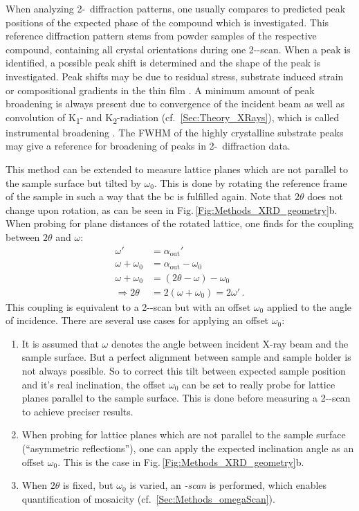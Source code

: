 When analyzing 2\texttheta-\textomega\ diffraction patterns, one usually compares to predicted peak positions of the expected phase of the compound which is investigated.
This reference diffraction pattern stems from powder samples of the respective compound, containing all crystal orientations during one 2\texttheta-\textomega-scan.
When a peak is identified, a possible peak shift is determined and the shape of the peak is investigated.
Peak shifts may be due to residual stress, substrate induced strain or compositional gradients in the thin film 
    \cite{harrington2021}.
A minimum amount of peak broadening is always present due to convergence of the incident beam as well as convolution of K\textalpha\textsubscript{1}- and K\textalpha\textsubscript{2}-radiation (cf.~\ref{Sec:Theory_XRays}), which is called instrumental broadening
    \cite{harrington2021}.
The \gls{FWHM} of the highly crystalline substrate peaks may give a reference for broadening of peaks in 2\texttheta-\textomega\ diffraction data.  

This method can be extended to measure lattice planes which are not parallel to the sample surface but tilted by $\omega_0$.
This is done by rotating the reference frame of the sample in such a way that the \gls{bc} is fulfilled again.
Note that $2\theta$ does not change upon rotation, as can be seen in Fig.\,\ref{Fig:Methods_XRD_geometry}b.
When probing for plane distances of the rotated lattice, one finds for the coupling between $2\theta$ and $\omega$:
\begin{align*}
    \omega'&=\alpha_\mathrm{out}'\\
    \omega+\omega_0&=\alpha_\mathrm{out}-\omega_0\\
    \omega+\omega_0&=(2\theta-\omega)-\omega_0\\
    \Rightarrow 2\theta&=2(\omega+\omega_0)=2\omega'\,.
\end{align*}
This coupling is equivalent to a 2\texttheta-\textomega-scan but with an offset $\omega_0$ applied to the angle of incidence.
There are several use cases for applying an offset $\omega_0$:
\begin{enumerate}[label=(\roman*)]
    \item It is assumed that $\omega$ denotes the angle between incident X-ray beam and the sample surface.
    But a perfect alignment between sample and sample holder is not always possible.
    So to correct this tilt between expected sample position and it's real inclination, the offset $\omega_0$ can be set to really probe for lattice planes parallel to the sample surface.
    This is done before measuring a 2\texttheta-\textomega-scan to achieve preciser results.
    \item When probing for lattice planes which are not parallel to the sample surface (\enquote{asymmetric reflections}), one can apply the expected inclination angle as an offset $\omega_0$.
    This is the case in Fig.\,\ref{Fig:Methods_XRD_geometry}b.
    \item When $2\theta$ is fixed, but $\omega_0$ is varied, an \emph{\textomega-scan} is performed, which enables quantification of mosaicity (cf.~\ref{Sec:Methods_omegaScan}).
\end{enumerate}

